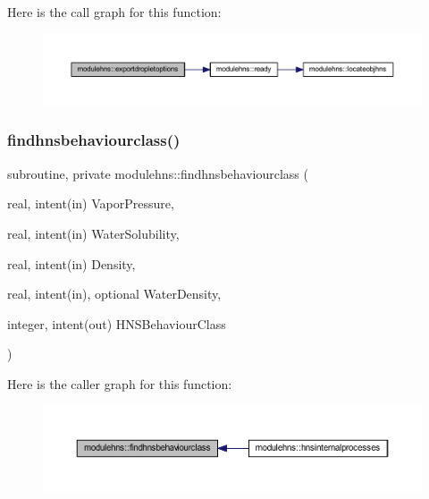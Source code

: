 Here is the call graph for this function\+:\nopagebreak
\begin{figure}[H]
\begin{center}
\leavevmode
\includegraphics[width=350pt]{namespacemodulehns_a2dabe744302beb8c44eef0780790d14a_cgraph}
\end{center}
\end{figure}
\mbox{\label{namespacemodulehns_a42753d96607d5c8c88073bec5ee71084}} 
\subsubsection{\texorpdfstring{findhnsbehaviourclass()}{findhnsbehaviourclass()}}
{\footnotesize\ttfamily subroutine, private modulehns\+::findhnsbehaviourclass (\begin{DoxyParamCaption}\item[{real, intent(in)}]{Vapor\+Pressure,  }\item[{real, intent(in)}]{Water\+Solubility,  }\item[{real, intent(in)}]{Density,  }\item[{real, intent(in), optional}]{Water\+Density,  }\item[{integer, intent(out)}]{H\+N\+S\+Behaviour\+Class }\end{DoxyParamCaption})\hspace{0.3cm}{\ttfamily [private]}}

Here is the caller graph for this function\+:\nopagebreak
\begin{figure}[H]
\begin{center}
\leavevmode
\includegraphics[width=350pt]{namespacemodulehns_a42753d96607d5c8c88073bec5ee71084_icgraph}
\end{center}
\end{figure}
\mbox{\label{namespacemodulehns_a837429821cbc45e6eb9a1c1aad7bef4e}} 
